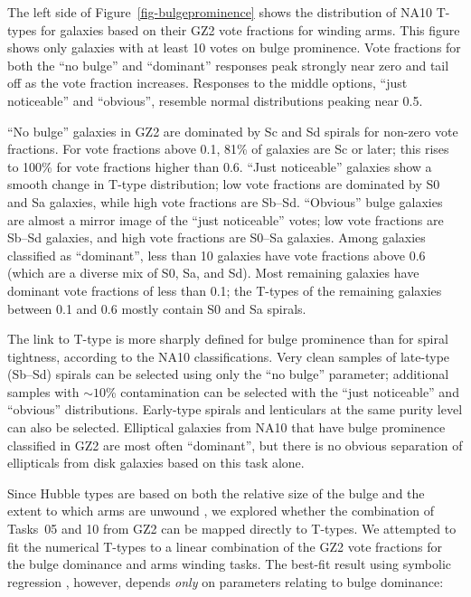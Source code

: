 \documentclass[useAMS,usenatbib]{mn2e}
\begin{document}
The left side of Figure~\ref{fig-bulgeprominence} shows the distribution of NA10 T-types for galaxies based on their GZ2 vote fractions for winding arms. This figure shows only galaxies with at least 10 votes on bulge prominence. Vote fractions for both the ``no bulge'' and ``dominant'' responses peak strongly near zero and tail off as the vote fraction increases. Responses to the middle options, ``just noticeable'' and ``obvious'', resemble normal distributions peaking near 0.5. 

``No bulge'' galaxies in GZ2 are dominated by Sc and Sd spirals for non-zero vote fractions. For vote fractions above 0.1, 81\% of galaxies are Sc or later; this rises to 100\% for vote fractions higher than 0.6. ``Just noticeable'' galaxies show a smooth change in T-type distribution; low vote fractions are dominated by S0 and Sa galaxies, while high vote fractions are Sb--Sd. ``Obvious'' bulge galaxies are almost a mirror image of the ``just noticeable'' votes; low vote fractions are Sb--Sd galaxies, and high vote fractions are S0--Sa galaxies. Among galaxies classified as ``dominant'', less than 10 galaxies have vote fractions above 0.6 (which are a diverse mix of S0, Sa, and Sd). Most remaining galaxies have dominant vote fractions of less than 0.1; the T-types of the remaining galaxies between 0.1 and 0.6 mostly contain S0 and Sa spirals. 

The link to T-type is more sharply defined for bulge prominence than for spiral tightness, according to the NA10 classifications. Very clean samples of late-type (Sb--Sd) spirals can be selected using only the ``no bulge'' parameter; additional samples with $\sim10$\% contamination can be selected with the ``just noticeable'' and ``obvious'' distributions. Early-type spirals and lenticulars at the same purity level can also be selected. Elliptical galaxies from NA10 that have bulge prominence classified in GZ2 are most often ``dominant'', but there is no obvious separation of ellipticals from disk galaxies based on this task alone. 

Since Hubble types are based on both the relative size of the bulge and the extent to which arms are unwound \citep{hub26}, we explored whether the combination of Tasks~05 and 10 from GZ2 can be mapped directly to T-types. We attempted to fit the numerical T-types to a linear combination of the GZ2 vote fractions for the bulge dominance and arms winding tasks. The best-fit result using symbolic regression \citep{sch09c}, however, depends {\em only} on parameters relating to bulge dominance:
\end{document}

